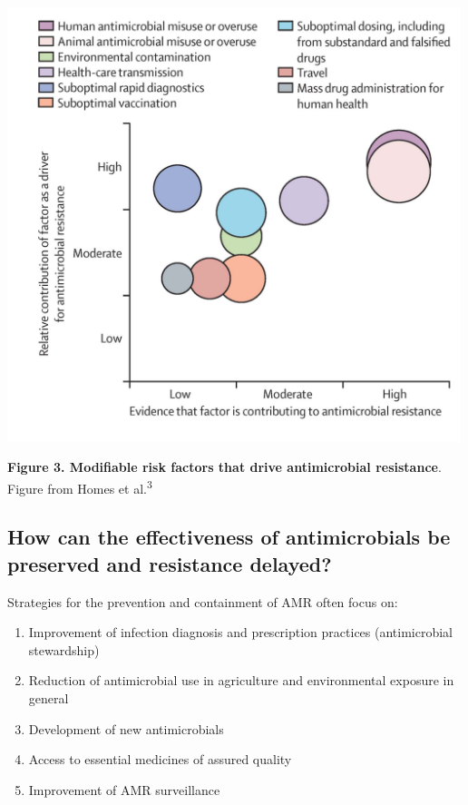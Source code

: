 \documentclass[
]{book}
\providecommand{\tightlist}{%
  \setlength{\itemsep}{0pt}\setlength{\parskip}{0pt}}
\begin{document}
\includegraphics[width=5.20833in,height=\textheight]{images/modifiablerisk.png}

\textbf{Figure 3. Modifiable risk factors that drive antimicrobial resistance}. Figure from Homes et al.\textsuperscript{3}

\hypertarget{how-can-the-effectiveness-of-antimicrobials-be-preserved-and-resistance-delayed}{%
\subsection*{How can the effectiveness of antimicrobials be preserved and resistance delayed?}\label{how-can-the-effectiveness-of-antimicrobials-be-preserved-and-resistance-delayed}}

Strategies for the prevention and containment of AMR often focus on:

\begin{enumerate}
\def\labelenumi{\arabic{enumi}.}
\tightlist
\item
  Improvement of infection diagnosis and prescription practices (antimicrobial stewardship)
\item
  Reduction of antimicrobial use in agriculture and environmental exposure in general
\item
  Development of new antimicrobials
\item
  Access to essential medicines of assured quality
\item
  Improvement of AMR surveillance
\end{enumerate}
\end{document}
